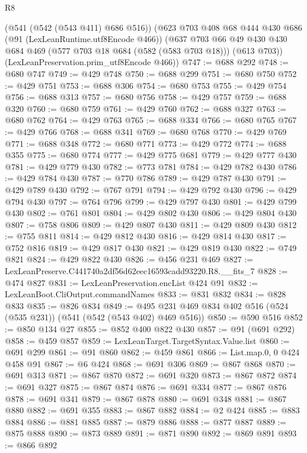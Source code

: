 \begin{lexlean}{R8}
\begin{coremodule}
    (@541 (@542 (@543 @411) @686 @516))
    (@623
      @703
      @408
      @68
      @444
      @430
      @686
      (@91 (LexLeanRuntime.utf8Encode @466))
      (@637
        @703
        @66
        @49
        @430
        @430
        @684
        @469
        (@577 @703 @18 @684 (@582 (@583 @703 @18)))
        (@613 @703))
      (LexLeanPreservation.prim_utf8Encode @466))
@747 := @688 @292
@748 := @680 @747
@749 := @429 @748
@750 := @688 @299
@751 := @680 @750
@752 := @429 @751
@753 := @688 @306
@754 := @680 @753
@755 := @429 @754
@756 := @688 @313
@757 := @680 @756
@758 := @429 @757
@759 := @688 @320
@760 := @680 @759
@761 := @429 @760
@762 := @688 @327
@763 := @680 @762
@764 := @429 @763
@765 := @688 @334
@766 := @680 @765
@767 := @429 @766
@768 := @688 @341
@769 := @680 @768
@770 := @429 @769
@771 := @688 @348
@772 := @680 @771
@773 := @429 @772
@774 := @688 @355
@775 := @680 @774
@777 := @429 @775 @681
@779 := @429 @777 @430
@781 := @429 @779 @430
@782 := @773 @781
@784 := @429 @782 @430
@786 := @429 @784 @430
@787 := @770 @786
@789 := @429 @787 @430
@791 := @429 @789 @430
@792 := @767 @791
@794 := @429 @792 @430
@796 := @429 @794 @430
@797 := @764 @796
@799 := @429 @797 @430
@801 := @429 @799 @430
@802 := @761 @801
@804 := @429 @802 @430
@806 := @429 @804 @430
@807 := @758 @806
@809 := @429 @807 @430
@811 := @429 @809 @430
@812 := @755 @811
@814 := @429 @812 @430
@816 := @429 @814 @430
@817 := @752 @816
@819 := @429 @817 @430
@821 := @429 @819 @430
@822 := @749 @821
@824 := @429 @822 @430
@826 := @456 @231 @469
@827 := LexLeanPreserve.C441740a2df56d62eec16593cadd93220.R8.__fits_7
@828 := @474 @827
@831 := LexLeanPreservation.encList @424 @91
@832 := LexLeanBoot.CliOutput.commandNames
@833 := @831 @832
@834 := @828 @833
@835 := @826 @834
@849 := @495 @231 @469 @834 @402 @516 (@524 (@535 @231)) (@541 (@542 (@543 @402) @469 @516))
@850 := @590 @516
@852 := @850 @134 @27
@855 := @852 @400 @822 @430
@857 := @91 (@691 @292)
@858 := @459 @857
@859 := LexLeanTarget.TargetSyntax.Value.list
@860 := @691 @299
@861 := @91 @860
@862 := @459 @861
@866 := List.map.{0, 0} @424 @458 @91
@867 := @6 @424
@868 := @691 @306
@869 := @867 @868
@870 := @691 @313
@871 := @867 @870
@872 := @691 @320
@873 := @867 @872
@874 := @691 @327
@875 := @867 @874
@876 := @691 @334
@877 := @867 @876
@878 := @691 @341
@879 := @867 @878
@880 := @691 @348
@881 := @867 @880
@882 := @691 @355
@883 := @867 @882
@884 := @2 @424
@885 := @883 @884
@886 := @881 @885
@887 := @879 @886
@888 := @877 @887
@889 := @875 @888
@890 := @873 @889
@891 := @871 @890
@892 := @869 @891
@893 := @866 @892

\end{coremodule}
\end{lexlean}
